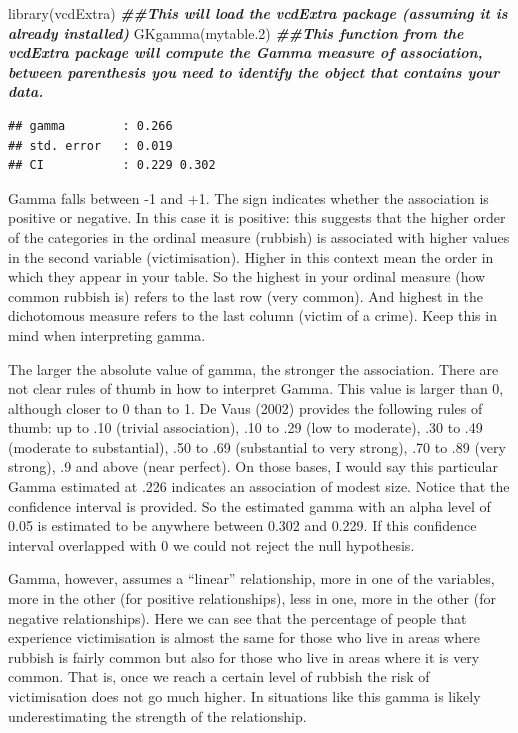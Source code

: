 \documentclass[
]{book}
\newenvironment{Shaded}{\begin{snugshade}}{\end{snugshade}}
\newcommand{\DocumentationTok}[1]{\textcolor[rgb]{0.56,0.35,0.01}{\textbf{\textit{#1}}}}
\newcommand{\FloatTok}[1]{\textcolor[rgb]{0.00,0.00,0.81}{#1}}
\newcommand{\FunctionTok}[1]{\textcolor[rgb]{0.00,0.00,0.00}{#1}}
\newcommand{\NormalTok}[1]{#1}
\begin{document}
\begin{Shaded}
\begin{Highlighting}[]
\FunctionTok{library}\NormalTok{(vcdExtra) }\DocumentationTok{\#\#This will load the vcdExtra package (assuming it is already installed)}
\FunctionTok{GKgamma}\NormalTok{(mytable}\FloatTok{.2}\NormalTok{) }\DocumentationTok{\#\#This function from the vcdExtra package will compute the Gamma measure of association, between parenthesis you need to identify the object that contains your data.}
\end{Highlighting}
\end{Shaded}

\begin{verbatim}
## gamma        : 0.266 
## std. error   : 0.019 
## CI           : 0.229 0.302
\end{verbatim}

Gamma falls between -1 and +1. The sign indicates whether the association is positive or negative. In this case it is positive: this suggests that the higher order of the categories in the ordinal measure (rubbish) is associated with higher values in the second variable (victimisation). Higher in this context mean the order in which they appear in your table. So the highest in your ordinal measure (how common rubbish is) refers to the last row (very common). And highest in the dichotomous measure refers to the last column (victim of a crime). Keep this in mind when interpreting gamma.

The larger the absolute value of gamma, the stronger the association. There are not clear rules of thumb in how to interpret Gamma. This value is larger than 0, although closer to 0 than to 1. De Vaus (2002) provides the following rules of thumb: up to .10 (trivial association), .10 to .29 (low to moderate), .30 to .49 (moderate to substantial), .50 to .69 (substantial to very strong), .70 to .89 (very strong), .9 and above (near perfect). On those bases, I would say this particular Gamma estimated at .226 indicates an association of modest size. Notice that the confidence interval is provided. So the estimated gamma with an alpha level of 0.05 is estimated to be anywhere between 0.302 and 0.229. If this confidence interval overlapped with 0 we could not reject the null hypothesis.

Gamma, however, assumes a ``linear'' relationship, more in one of the variables, more in the other (for positive relationships), less in one, more in the other (for negative relationships). Here we can see that the percentage of people that experience victimisation is almost the same for those who live in areas where rubbish is fairly common but also for those who live in areas where it is very common. That is, once we reach a certain level of rubbish the risk of victimisation does not go much higher. In situations like this gamma is likely underestimating the strength of the relationship.
\end{document}
